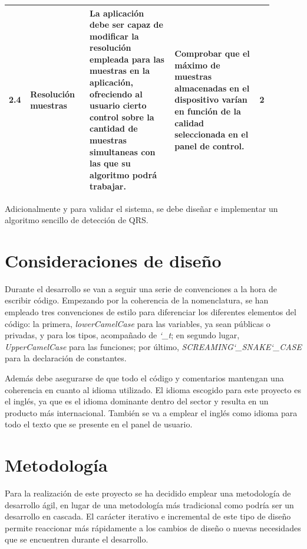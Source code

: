 \begin{scriptsize}
\begin{longtable}{|p{0.05\linewidth}|p{0.21\linewidth}|p{0.3\linewidth}|p{0.3\linewidth}|p{0.03\linewidth}|}
        2.4     & Resolución muestras & La aplicación debe ser capaz de modificar la resolución empleada para las muestras en la aplicación, ofreciendo al usuario cierto control sobre la cantidad de muestras simultaneas con las que su algoritmo podrá trabajar. & Comprobar que el máximo de muestras almacenadas en el dispositivo varían en función de la calidad seleccionada en el panel de control. & 2 \\ \hline
    \end{longtable}        
    \end{scriptsize}
    
    Adicionalmente y para validar el sistema, se debe diseñar e implementar un algoritmo sencillo de detección de QRS. 
    \clearpage

\section{Consideraciones de diseño}

    Durante el desarrollo se van a seguir una serie de convenciones a la hora de escribir código. Empezando por la coherencia de la nomenclatura, se han empleado tres convenciones de estilo para diferenciar los diferentes elementos del código: la primera,  \textit{lowerCamelCase} para las variables, ya sean públicas o privadas, y para los tipos, acompañado de \textit{\char`_t}; en segundo lugar, \textit{UpperCamelCase} para las funciones; por último,  \textit{SCREAMING\char`_SNAKE\char`_CASE} para la declaración de constantes.
        
    Además debe asegurarse de que todo el código y comentarios mantengan una coherencia en cuanto al idioma utilizado. El idioma escogido para este proyecto es el inglés, ya que es el idioma dominante dentro del sector y resulta en un producto más internacional. También se va a emplear el inglés como idioma para todo el texto que se presente en el panel de usuario.

\section{Metodología}

    Para la realización de este proyecto se ha decidido emplear una metodología de desarrollo ágil, en lugar de una metodología más tradicional como podría ser un desarrollo en cascada. El carácter iterativo e incremental de este tipo de diseño permite reaccionar más rápidamente a los cambios de diseño o nuevas necesidades que se encuentren durante el desarrollo.

